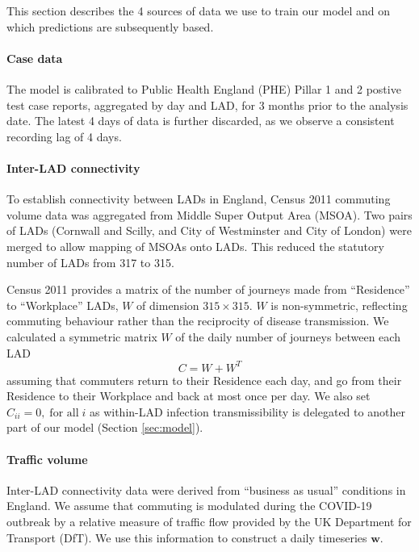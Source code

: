 \documentclass[a4paper]{article}
\begin{document}
This section describes the 4 sources of data we use to train our model and on which
predictions are subsequently based.

\paragraph{Case data}
The model is calibrated to Public Health England (PHE) Pillar 1 and 2 postive test case reports,
aggregated by day and LAD, for 3 months prior to the analysis date.  The latest 4 days of
data is further discarded, as we observe a consistent recording lag of 4 days\footnotemark.

\paragraph{Inter-LAD connectivity}\label{sec:commute-data}
To establish connectivity between LADs in England, Census 2011 commuting volume data was
aggregated from Middle Super Output Area (MSOA). Two pairs of LADs (Cornwall and Scilly,
and City of Westminster and City of London) were merged to allow
mapping of MSOAs onto LADs.  This reduced the statutory number of LADs from 317 to 315.

Census 2011 provides a matrix of the number of journeys made from
“Residence” to “Workplace” LADs, $W$ of dimension $315 \times 315$.  $W$ is non-symmetric, reflecting
commuting behaviour rather than the reciprocity of disease transmission.  We calculated a
symmetric matrix $W$ of the daily number of journeys between each LAD
$$C = W + W^T$$
assuming that commuters return to their Residence each day, and go from their Residence to
their Workplace and back at most once per day.  We also set
$C_{ii} = 0, \; \mbox{for all}\; i$
as within-LAD infection transmissibility is delegated to another part of our model
(Section \ref{sec:model}).


\paragraph{Traffic volume}\label{sec:traffic-data}
Inter-LAD connectivity data were derived from “business as usual” conditions in
England.   We assume that commuting is modulated during the COVID-19 outbreak by a relative
measure of traffic flow provided by the UK Department for Transport (DfT).  We use this
information to construct a daily timeseries $\bm{w}$\footnotemark[\value{footnote}].

\end{document}
